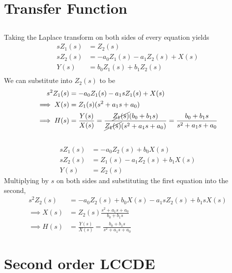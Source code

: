 \documentclass{article}
\begin{document}
\section{Transfer Function}

\subsection{}

Taking the Laplace transform on both sides of every equation yields
\begin{align}
    s Z_1(s) &= Z_2(s) \\
    s Z_2(s) &= -a_0 Z_1(s) - a_1 Z_2(s) + X(s) \\
    Y(s) &= b_0 Z_1(s) + b_1 Z_2(s) \\
\end{align}
We can substitute into \(Z_2(s)\) to be
\begin{align}
    s^2 Z_1(s) &= -a_0 Z_1(s) - a_1 s Z_1(s) + X(s) \\
    \implies X(s) &= Z_1(s) (s^2 + a_1 s + a_0) \\
    \implies H(s) &= \frac{Y(s)}{X(s)} = \frac{\cancel{Z_1(s)} (b_0 + b_1 s)}{\cancel{Z_1(s)} (s^2 + a_1 s + a_0)} = \frac{b_0 + b_1 s}{s^2 + a_1 s + a_0}
\end{align}

\subsection{}

\begin{align}
    s Z_1(s) &= -a_0 Z_2(s) + b_0 X(s) \\
    s Z_2(s) &= Z_1(s) - a_1 Z_2(s) + b_1 X(s) \\
    Y(s) &= Z_2(s)
\end{align}
Multiplying by \(s\) on both sides and substituting the first equation into the second,
\begin{align}
    s^2 Z_2(s) &= -a_0 Z_2(s) + b_0 X(s) - a_1 s Z_2(s) + b_1 s X(s) \\
    \implies X(s) &= Z_2(s) \frac{s^2 + a_1 s + a_0}{b_0 + b_1 s} \\
    \implies H(s) &= \frac{Y(s)}{X(s)} = \frac{b_0 + b_1 s}{s^2 + a_1 s + a_0}
\end{align}

\section{Second order LCCDE}
\end{document}
